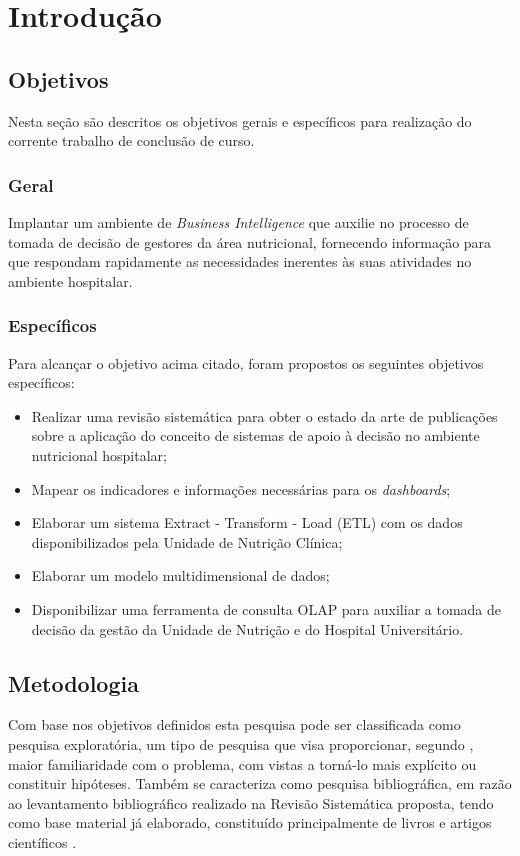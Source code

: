 \chapter{Introdução}


\section{Objetivos}\label{sec-divisoes}
Nesta seção são descritos os objetivos gerais e específicos para realização do corrente trabalho de conclusão de curso.

\subsection{Geral}\label{sec-divisoes-subsection}
Implantar um ambiente de \textit{Business Intelligence} que auxilie no processo de tomada de decisão de gestores da área nutricional, fornecendo informação para que respondam rapidamente as necessidades inerentes às suas atividades no ambiente hospitalar.

\subsection{Específicos}\label{sec-divisoes-subsection}
Para alcançar o objetivo acima citado, foram propostos os seguintes objetivos específicos:
\begin{itemize}
 \item Realizar uma revisão sistemática para obter o estado da arte de publicações sobre a aplicação do conceito de sistemas de apoio à decisão no ambiente nutricional hospitalar;

 \item Mapear os indicadores e informações necessárias para os \textit{dashboards};

 \item Elaborar um sistema Extract - Transform - Load (ETL) com os dados disponibilizados pela Unidade de Nutrição Clínica;
 
 \item Elaborar um modelo multidimensional de dados;
 
 \item Disponibilizar uma ferramenta de consulta OLAP para auxiliar a tomada de decisão da gestão da Unidade de Nutrição e do Hospital Universitário.
\end{itemize}

\section{Metodologia}\label{sec-divisoes}
Com base nos objetivos definidos esta pesquisa pode ser classificada como pesquisa exploratória, um tipo de pesquisa que visa proporcionar, segundo , maior familiaridade com o problema, com vistas a torná-lo mais explícito ou constituir hipóteses.
Também se caracteriza como pesquisa bibliográfica, em razão ao levantamento bibliográfico realizado na Revisão Sistemática proposta, tendo como base material já elaborado, constituído principalmente de livros e artigos científicos \cite{gil2002}.

